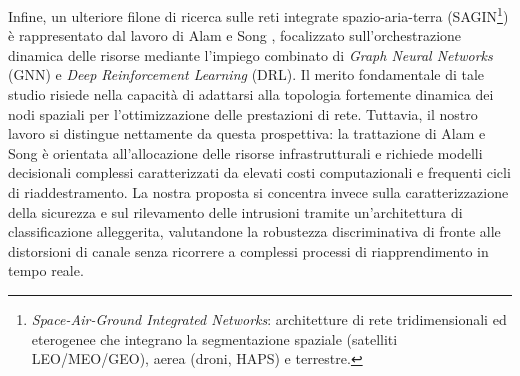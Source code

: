 Infine, un ulteriore filone di ricerca sulle reti integrate spazio-aria-terra (SAGIN\footnote{\textit{Space-Air-Ground Integrated Networks}: architetture di rete tridimensionali ed eterogenee che integrano la segmentazione spaziale (satelliti LEO/MEO/GEO), aerea (droni, HAPS) e terrestre.}) è rappresentato dal lavoro di Alam e Song \cite{alam2024}, focalizzato sull'orchestrazione dinamica delle risorse mediante l'impiego combinato di \textit{Graph Neural Networks} (GNN) e \textit{Deep Reinforcement Learning} (DRL). 
Il merito fondamentale di tale studio risiede nella capacità di adattarsi alla topologia fortemente dinamica dei nodi spaziali per l'ottimizzazione delle prestazioni di rete. 
Tuttavia, il nostro lavoro si distingue nettamente da questa prospettiva: la trattazione di Alam e Song è orientata all'allocazione delle risorse infrastrutturali e richiede modelli decisionali complessi caratterizzati da elevati costi computazionali e frequenti cicli di riaddestramento. 
La nostra proposta si concentra invece sulla caratterizzazione della sicurezza e sul rilevamento delle intrusioni tramite un'architettura di classificazione alleggerita, valutandone la robustezza discriminativa di fronte alle distorsioni di canale senza ricorrere a complessi processi di riapprendimento in tempo reale.

